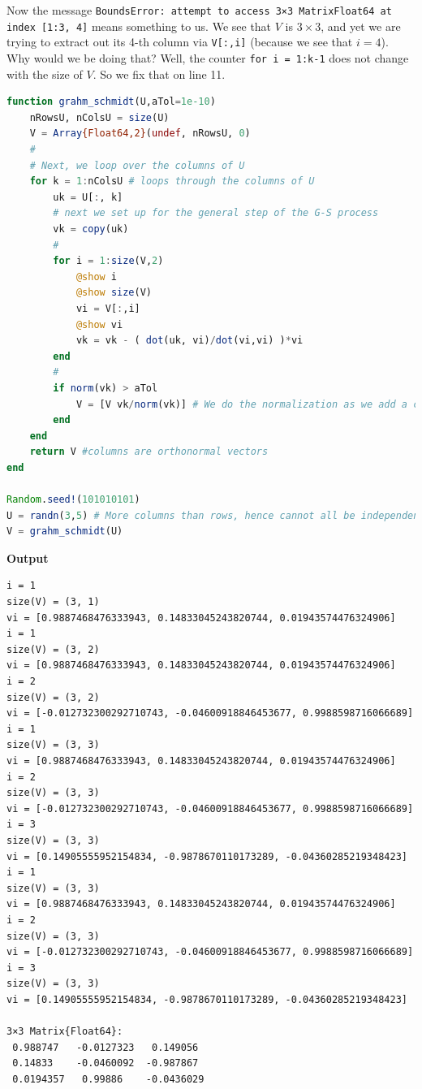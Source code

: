 Now the message \texttt{BoundsError: attempt to access 3×3 Matrix{Float64} at index [1:3, 4]} means something to us. We see that $V$ is $3 \times 3$, and yet we are trying to extract out its 4-th column via \texttt{V[:,i]} (because we see that $i=4$). Why would we be doing that? Well, the counter \texttt{for i = 1:k-1} does not change with the size of $V$. So we fix that on line 11. 

\begin{lstlisting}[language=Julia,style=mystyle]
function grahm_schmidt(U,aTol=1e-10)
    nRowsU, nColsU = size(U) 
    V = Array{Float64,2}(undef, nRowsU, 0)
    #
    # Next, we loop over the columns of U
    for k = 1:nColsU # loops through the columns of U
        uk = U[:, k] 
        # next we set up for the general step of the G-S process
        vk = copy(uk)
        #
        for i = 1:size(V,2)
            @show i
            @show size(V)
            vi = V[:,i]
            @show vi
            vk = vk - ( dot(uk, vi)/dot(vi,vi) )*vi
        end
        #
        if norm(vk) > aTol
            V = [V vk/norm(vk)] # We do the normalization as we add a column to V
        end
    end
    return V #columns are orthonormal vectors
end

Random.seed!(101010101)
U = randn(3,5) # More columns than rows, hence cannot all be independent.
V = grahm_schmidt(U)
\end{lstlisting}
\textbf{Output} 
\begin{verbatim}
i = 1
size(V) = (3, 1)
vi = [0.9887468476333943, 0.14833045243820744, 0.01943574476324906]
i = 1
size(V) = (3, 2)
vi = [0.9887468476333943, 0.14833045243820744, 0.01943574476324906]
i = 2
size(V) = (3, 2)
vi = [-0.012732300292710743, -0.04600918846453677, 0.9988598716066689]
i = 1
size(V) = (3, 3)
vi = [0.9887468476333943, 0.14833045243820744, 0.01943574476324906]
i = 2
size(V) = (3, 3)
vi = [-0.012732300292710743, -0.04600918846453677, 0.9988598716066689]
i = 3
size(V) = (3, 3)
vi = [0.14905555952154834, -0.9878670110173289, -0.04360285219348423]
i = 1
size(V) = (3, 3)
vi = [0.9887468476333943, 0.14833045243820744, 0.01943574476324906]
i = 2
size(V) = (3, 3)
vi = [-0.012732300292710743, -0.04600918846453677, 0.9988598716066689]
i = 3
size(V) = (3, 3)
vi = [0.14905555952154834, -0.9878670110173289, -0.04360285219348423]

3×3 Matrix{Float64}:
 0.988747   -0.0127323   0.149056
 0.14833    -0.0460092  -0.987867
 0.0194357   0.99886    -0.0436029
\end{verbatim}

